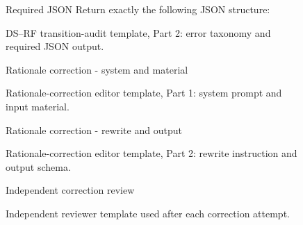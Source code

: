 \begin{figure}[p]
\begin{minipage}{\textwidth}
\begin{promptboxcompact}{Required JSON}
{\smallskip
Return exactly the following JSON structure:}
\end{promptboxcompact}

\end{minipage}
\caption{DS--RF transition-audit template, Part 2: error taxonomy and required JSON output.}
\label{fig:transition-audit-p2}
\end{figure}

\begin{figure}[p]
\begin{promptboxcompact}{Rationale correction - system and material}
\PromptText{\RationaleCorrectionPartOne}
\end{promptboxcompact}
\caption{Rationale-correction editor template, Part 1: system prompt and input material.}
\label{fig:rationale-correction-p1}
\end{figure}

\begin{figure}[p]
\begin{promptboxcompact}{Rationale correction - rewrite and output}
\PromptText{\RationaleCorrectionPartTwo}
\end{promptboxcompact}
\caption{Rationale-correction editor template, Part 2: rewrite instruction and output schema.}
\label{fig:rationale-correction-p2}
\end{figure}

\begin{figure}[p]
\begin{promptboxcompact}{Independent correction review}
\PromptText{\CorrectionReviewerPrompt}
\end{promptboxcompact}
\caption{Independent reviewer template used after each correction attempt.}
\label{fig:correction-reviewer}
\end{figure}
